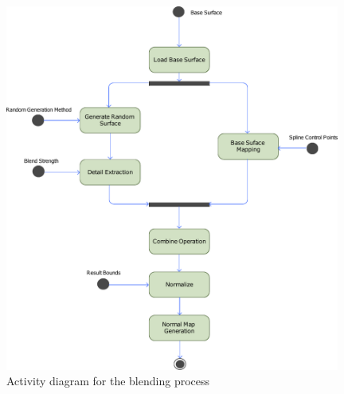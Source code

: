       \begin{figure}[h]
      	\begin{center}
      	  \includegraphics[width=0.98\textwidth]{images/diagrams/blending_process.pdf}
      	\end{center}
        \caption{Activity diagram for the blending process}
        \label{fig:activity_blending_process}
      \end{figure} 
      
